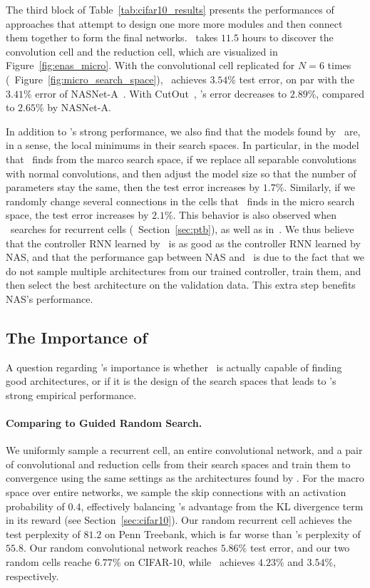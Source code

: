 The third block of Table~\ref{tab:cifar10_results} presents the performances of approaches that attempt to design one more more modules and then connect them together to form the final networks. \enas~takes $11.5$ hours to discover the convolution cell and the reduction cell, which are visualized in Figure~\ref{fig:enas_micro}. With the convolutional cell replicated for $N=6$ times (\cf~Figure~\ref{fig:micro_search_space}), \enas~achieves $3.54\%$ test error, on par with the $3.41\%$ error of NASNet-A~\citep{nas_module}. With CutOut~\citep{cut_out}, \enas's error decreases to $2.89\%$, compared to $2.65\%$ by NASNet-A.

In addition to \enas's strong performance, we also find that the models found by \enas~are, in a sense, the local minimums in their search spaces. In particular, in the model that \enas~finds from the marco search space, if we replace all separable convolutions with normal convolutions, and then adjust the model size so that the number of parameters stay the same, then the test error increases by $1.7\%$. Similarly, if we randomly change several connections in the cells that \enas~finds in the micro search space, the test error increases by $2.1\%$. This behavior is also observed when \enas~searches for recurrent cells (\cf~Section~\ref{sec:ptb}), as well as in~\citet{nas}. We thus believe that the controller RNN learned by \enas~is as good as the controller RNN learned by NAS, and that the performance gap between NAS and \enas~is due to the fact that we do not sample multiple architectures from our trained controller, train them, and then select the best architecture on the validation data. This extra step benefits NAS's performance.

\subsection{The Importance of \enas}
A question regarding \enas's importance is whether \enas~is actually capable of finding good architectures, or if it is the design of the search spaces that leads to \enas's strong empirical performance.

\paragraph{Comparing to Guided Random Search.} We uniformly sample a recurrent cell, an entire convolutional network, and a pair of convolutional and reduction cells from their search spaces and train them to convergence using the same settings as the architectures found by \enas. For the macro space over entire networks, we sample the skip connections with an activation probability of $0.4$, effectively balancing \enas's advantage from the KL divergence term in its reward (see Section~\ref{sec:cifar10}). Our random recurrent cell achieves the test perplexity of $81.2$ on Penn Treebank, which is far worse than \enas's perplexity of $55.8$. Our random convolutional network reaches $5.86\%$ test error, and our two random cells reache $6.77\%$ on CIFAR-10, while \enas~achieves $4.23\%$ and $3.54\%$, respectively.

